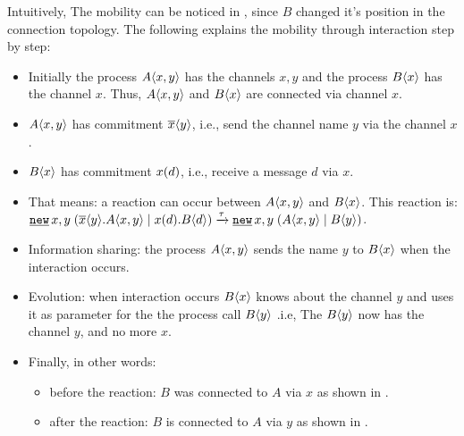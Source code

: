 Intuitively, The mobility can be noticed in , since $B$ changed it's position in the connection topology.
The following explains the mobility through interaction step by step:
\begin{itemize}
\item Initially the process $A\langle x,y\rangle$ has the channels $x,y$ and the process $B\langle x\rangle$ has the channel $x$. Thus, $A\langle x,y\rangle$ and $B\langle x\rangle$ are connected via channel $x$.
\item $A\langle x,y\rangle$ has commitment $\overline{x}\langle{y}\rangle$, i.e., send the channel name $y$ via the channel $x$.
\item $B\langle x\rangle$ has commitment $x({d})$, i.e., receive a message $d$ via $x$.
\item That means: a reaction can occur between $A\langle x,y\rangle$ and $B\langle x\rangle$. This reaction is: $\procres{x,y}{(\procpar{\out{x}{{y}}.\proccall{A}{x,y}}{\inp{x}{{d}}.\proccall{B}{d}})} \transs{\tau} \procres{x,y}{(\procpar{\proccall{A}{x,y}}{\proccall{B}{y}})}$.
\item Information sharing: the process $A\langle x,y\rangle$ sends the name $y$ to $B\langle x\rangle$ when the interaction occurs.
\item Evolution: when interaction occurs $B\langle x\rangle$ knows about the channel $y$ and uses it as parameter for the the process call $B\langle y\rangle$ .i.e, The  $B\langle y\rangle$ now has the channel $y$, and no more $x$.
\item Finally, in other words: 
\begin{itemize}
\item before the reaction: $B$ was connected to $A$ via $x$ as shown in .
\item after the reaction: $B$ is connected to $A$ via $y$ as shown in .
\end{itemize}
\end{itemize}
